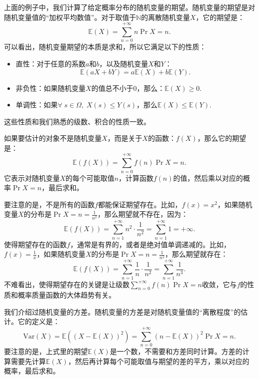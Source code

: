 \documentclass[12pt,UTF8,fontset=none]{ctexbook}
\begin{document}
上面的例子中，我们计算了给定概率分布的随机变量的期望。随机变量的期望是对随机变量值的“加权平均数值”。对于取值于$\mathbb{N}$的离散随机变量$X$，它的期望是：
\[
    \mathbb{E}(X) = \sum_{n=0}^{+\infty} n \Pr{X=n}.
\]
可以看出，随机变量期望的本质是求和，所以它满足以下的性质：
\begin{itemize}
    \item 直性：对于任意的系数$a$和$b$，以及随机变量$X$和$Y$：
    \[
        \mathbb{E}(aX + bY) = a\mathbb{E}(X) + b\mathbb{E}(Y).
    \]
    \item 非负性：如果随机变量$X$的值总不小于$0$，那么：$\mathbb{E}(X) \geqslant 0.$
    \item 单调性：如果$\forall \; s\in \Omega, \; X(s)\leqslant Y(s)$，那么$\mathbb{E}(X) \leqslant \mathbb{E}(Y).$
\end{itemize}
这些性质和我们熟悉的级数、积合的性质一致。

如果要估计的对象不是随机变量$X$，而是关于$X$的函数：$f(X)$，那么它的期望是：
\[
    \mathbb{E}(f(X)) = \sum_{n=0}^{+\infty} f(n) \Pr{X=n}.
\]
它表示对随机变量$X$的每个可能取值$n$，计算函数$f(n)$的值，然后乘以对应的概率$\Pr{X=n}$，最后求和。

要注意的是，不是所有的函数$f$都能保证期望存在。比如，$f(x) = x^2$，如果随机变量$X$的分布是$\Pr{X=n} = \frac{1}{n^2}$，那么期望就不存在，因为：
\[
    \mathbb{E}(f(X)) = \sum_{n=1}^{+\infty} n^2 \cdot \frac{1}{n^2} = \sum_{n=1}^{+\infty} 1 = +\infty.
\]
使得期望存在的函数$f$，通常是有界的，或者是绝对值单调递减的。比如，$f(x) = \frac{1}{x}$，如果随机变量$X$的分布是$\Pr{X=n} = \frac{1}{n^2}$，那么期望就存在：
\[
    \mathbb{E}(f(X)) = \sum_{n=1}^{+\infty} \frac{1}{n} \cdot \frac{1}{n^2} = \sum_{n=1}^{+\infty} \frac{1}{n^3}.
\]
不难看出，使得期望存在的关键是让级数$\sum_{n=0}^{+\infty} f(n) \Pr{X=n}$收敛，它与$f$的性质和概率质量函数的大体趋势有关。

我们介绍过随机变量的方差。随机变量的方差是对随机变量值的“离散程度”的估计。它的定义是：
\[
    \text{Var}(X) = \mathbb{E}((X - \mathbb{E}(X))^2) = \sum_{n=0}^{+\infty} (n - \mathbb{E}(X))^2 \Pr{X=n}.
\]
要注意的是，上式里的期望$\mathbb{E}(X)$是一个数，不需要和方差同时计算。方差的计算需要先计算$\mathbb{E}(X)$，然后再计算每个可能取值与期望的差的平方，乘以对应的概率，最后求和。
\end{document}
